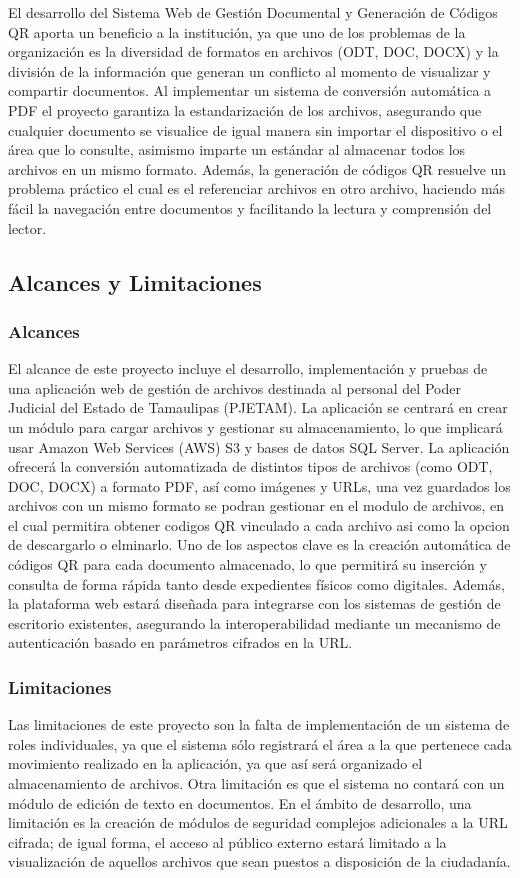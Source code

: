 El desarrollo del Sistema Web de Gestión Documental y Generación de Códigos QR aporta un beneficio a la institución, ya que uno de los problemas de la organización es la diversidad de formatos en archivos (ODT, DOC, DOCX) y la división de la información que generan un conflicto al momento de visualizar y compartir documentos. Al implementar un sistema de conversión automática a PDF el proyecto garantiza la estandarización de los archivos, asegurando que cualquier documento se visualice de igual manera sin importar el dispositivo o el área que lo consulte, asimismo imparte un estándar al almacenar todos los archivos en un mismo formato. Además, la generación de códigos QR resuelve un problema práctico el cual es el referenciar archivos en otro archivo, haciendo más fácil la navegación entre documentos y facilitando la lectura y comprensión del lector.
\subsection{Alcances y Limitaciones}
\label{sec:alcances_limitaciones}

\subsubsection{Alcances}
\label{subsec:alcances}
El alcance de este proyecto incluye el desarrollo, implementación y pruebas de una aplicación web de gestión de archivos destinada al personal del Poder Judicial del Estado de Tamaulipas (PJETAM). La aplicación se centrará en crear un módulo para cargar archivos y gestionar su almacenamiento, lo que implicará usar Amazon Web Services (AWS) S3 y bases de datos SQL Server. 
La aplicación ofrecerá la conversión automatizada de  distintos tipos de archivos (como ODT, DOC, DOCX) a formato PDF, así como imágenes y URLs, una vez guardados los archivos con un mismo formato se podran gestionar en el modulo de archivos, en el cual permitira obtener codigos QR vinculado a cada archivo asi como la opcion de descargarlo o elminarlo. Uno de los aspectos clave es la creación automática de códigos QR para cada documento almacenado, lo que permitirá su inserción y consulta de forma rápida tanto desde expedientes físicos como digitales. Además, la plataforma web estará diseñada para integrarse con los sistemas de gestión de escritorio existentes, asegurando la interoperabilidad mediante un mecanismo de autenticación basado en parámetros cifrados en la URL.

\subsubsection{Limitaciones}
\label{subsec:limitaciones}
Las limitaciones de este proyecto son la falta de implementación de un sistema de roles individuales, ya que el sistema sólo registrará el área a la que pertenece cada movimiento realizado en la aplicación, ya que así será organizado el almacenamiento de archivos. Otra limitación es que el sistema no contará con un módulo de edición de texto en documentos. 
En el ámbito de desarrollo, una limitación es la creación de módulos de seguridad complejos adicionales a la URL cifrada; de igual forma, el acceso al público externo estará limitado a la visualización de aquellos archivos que sean puestos a disposición de la ciudadanía.